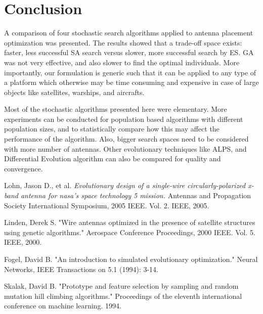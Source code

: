 \documentclass[conference]{IEEEtran}
\begin{document}
\section{Conclusion}
A comparison of four stochastic search algorithms applied to antenna placement optimization was presented. The results showed that a trade-off space exists: faster, less successful SA search versus slower, more successful search by ES. GA was not very effective, and also slower to find the optimal individuals. More importantly, our formulation is generic such that it can be applied to any type of a platform which otherwise may be time consuming and expensive in case of large objects like satellites, warships, and aircrafts. 

Most of the stochastic algorithms presented here were elementary. More experiments can be conducted for population based algorithms with different population sizes, and to statistically compare how this may affect the performance of the algorithm. Also, bigger search spaces need to be considered with more number of antennas. Other evolutionary techniques like ALPS, and Differential Evolution algorithm can also be compared for quality and convergence.

\begin{thebibliography}{1}

Lohn, Jason D., et al. \emph{Evolutionary design of a single-wire circularly-polarized x-band antenna for nasa's space technology 5 mission.} Antennas and Propagation Society International Symposium, 2005 IEEE. Vol. 2. IEEE, 2005.

Linden, Derek S. "Wire antennas optimized in the presence of satellite structures using genetic algorithms." Aerospace Conference Proceedings, 2000 IEEE. Vol. 5. IEEE, 2000.

Fogel, David B. "An introduction to simulated evolutionary optimization." Neural Networks, IEEE Transactions on 5.1 (1994): 3-14.

Skalak, David B. "Prototype and feature selection by sampling and random mutation hill climbing algorithms." Proceedings of the eleventh international conference on machine learning. 1994.
\end{thebibliography}
\end{document}
